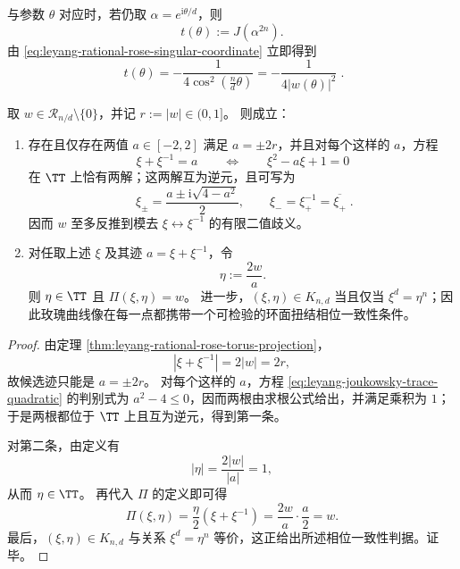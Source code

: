 与参数 \(\theta\) 对应时，若仍取 \(\alpha=e^{\mathrm{i}\theta/d}\)，则
\begin{equation}\label{eq:leyang-polar-family-t-def}
t(\theta):=J(\alpha^{2n}).
\end{equation}
由 \eqref{eq:leyang-rational-rose-singular-coordinate} 立即得到
\begin{equation}\label{eq:leyang-polar-family-t-closed}
\boxed{\;
t(\theta)
=-\frac{1}{4\cos^2(\frac{n}{d}\theta)}
=-\frac{1}{4|w(\theta)|^2}\; }.
\end{equation}

\begin{corollary}[玫瑰曲线点的有限歧义单位圆反推]\label{cor:leyang-rational-rose-finite-ambiguity}
取 \(w\in\mathcal R_{n/d}\setminus\{0\}\)，并记 \(r:=|w|\in(0,1]\)。
则成立：
\begin{enumerate}
  \item 存在且仅存在两值 \(a\in[-2,2]\) 满足 \(a=\pm 2r\)，并且对每个这样的 \(a\)，方程
  \begin{equation}\label{eq:leyang-joukowsky-trace-quadratic}
  \xi+\xi^{-1}=a
  \qquad\Longleftrightarrow\qquad
  \xi^2-a\xi+1=0
  \end{equation}
  在 \(\TT\) 上恰有两解；这两解互为逆元，且可写为
  \begin{equation}\label{eq:leyang-joukowsky-trace-roots}
  \boxed{\;
  \xi_{\pm}=\frac{a\pm\mathrm{i}\sqrt{4-a^2}}{2},\qquad
  \xi_-=\xi_+^{-1}=\overline{\xi_+}\; }.
  \end{equation}
  因而 \(w\) 至多反推到模去 \(\xi\leftrightarrow\xi^{-1}\) 的有限二值歧义。
  \item 对任取上述 \(\xi\) 及其迹 \(a=\xi+\xi^{-1}\)，令
  \[
  \eta:=\frac{2w}{a}.
  \]
  则 \(\eta\in\TT\) 且 \(\Pi(\xi,\eta)=w\)。
  进一步，\((\xi,\eta)\in K_{n,d}\) 当且仅当 \(\xi^d=\eta^n\)；因此玫瑰曲线像在每一点都携带一个可检验的环面扭结相位一致性条件。
\end{enumerate}
\end{corollary}
\begin{proof}
由定理 \ref{thm:leyang-rational-rose-torus-projection}，
\[
|\xi+\xi^{-1}|=2|w|=2r,
\]
故候选迹只能是 \(a=\pm 2r\)。
对每个这样的 \(a\)，方程 \eqref{eq:leyang-joukowsky-trace-quadratic} 的判别式为 \(a^2-4\le 0\)，因而两根由求根公式给出，并满足乘积为 \(1\)；于是两根都位于 \(\TT\) 上且互为逆元，得到第一条。

对第二条，由定义有
\[
|\eta|=\frac{2|w|}{|a|}=1,
\]
从而 \(\eta\in\TT\)。
再代入 \(\Pi\) 的定义即可得
\[
\Pi(\xi,\eta)=\frac{\eta}{2}(\xi+\xi^{-1})=\frac{2w}{a}\cdot\frac{a}{2}=w.
\]
最后，\((\xi,\eta)\in K_{n,d}\) 与关系 \(\xi^d=\eta^n\) 等价，这正给出所述相位一致性判据。证毕。
\end{proof}



